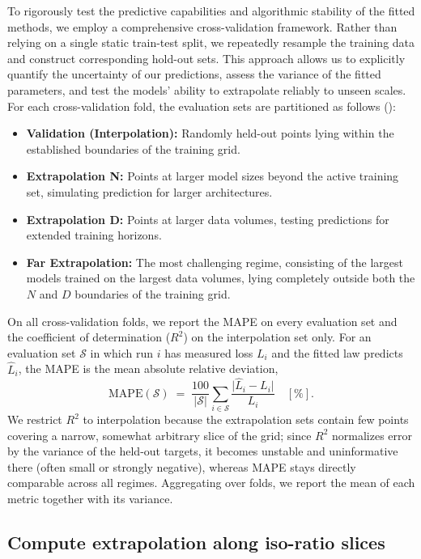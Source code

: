 \documentclass[]{fairmeta}
\begin{document}
To rigorously test the predictive capabilities and algorithmic stability of the fitted methods, we employ a comprehensive cross-validation framework. Rather than relying on a single static train-test split, we repeatedly resample the training data and construct corresponding hold-out sets. This approach allows us to explicitly quantify the uncertainty of our predictions, assess the variance of the fitted parameters, and test the models' ability to extrapolate reliably to unseen scales. For each cross-validation fold, the evaluation sets are partitioned as follows ():
\begin{itemize}
    \item \textbf{Validation (Interpolation):} Randomly held-out points lying within the established boundaries of the training grid.
    \item \textbf{Extrapolation N:} Points at larger model sizes beyond the active training set, simulating prediction for larger architectures.
    \item \textbf{Extrapolation D:} Points at larger data volumes, testing predictions for extended training horizons.
    \item \textbf{Far Extrapolation:} The most challenging regime, consisting of the largest models trained on the largest data volumes, lying completely outside both the $N$ and $D$ boundaries of the training grid.
\end{itemize}

On all cross-validation folds, we report the MAPE on every evaluation set and the coefficient of determination ($R^2$) on the interpolation set only. For an evaluation set $\mathcal{S}$ in which run $i$ has measured loss $L_i$ and the fitted law predicts $\hat{L}_i$, the MAPE is the mean absolute relative deviation,
\begin{equation}
    \mathrm{MAPE}(\mathcal{S}) \;=\; \frac{100}{\lvert\mathcal{S}\rvert}\sum_{i\in\mathcal{S}}\frac{\bigl\lvert \hat{L}_i - L_i\bigr\rvert}{L_i}\quad[\%].
    \label{eq:mape}
\end{equation}
We restrict $R^2$ to interpolation because the extrapolation sets contain few points covering a narrow, somewhat arbitrary slice of the grid; since $R^2$ normalizes error by the variance of the held-out targets, it becomes unstable and uninformative there (often small or strongly negative), whereas MAPE stays directly comparable across all regimes. Aggregating over folds, we report the mean of each metric together with its variance.

\subsection{Compute extrapolation along iso-ratio slices}
\label{sec:isoratio}
\end{document}
